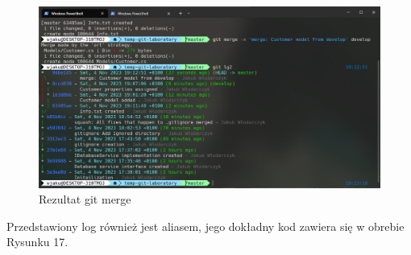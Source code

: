 \documentclass{article}
\begin{document}
\vspace*{\fill}
\begin{figure}[!h]
    \caption{Rezultat git merge}
    \centerline{\includegraphics [scale=0.5]{merge-result.PNG}}
    \label{fig:label}
\end{figure}
Przedstawiony log również jest aliasem, jego dokładny kod zawiera się w obrebie Rysunku 17.
\vspace*{\fill}
\newpage
\end{document}
